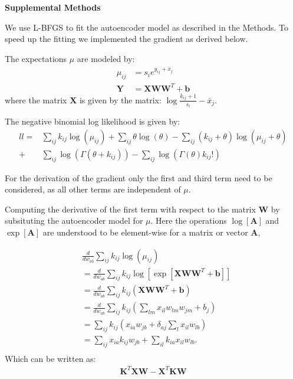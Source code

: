 \documentclass[11pt]{letter}
\newcommand{\matr}[1]{\mathbf{#1}}
\begin{document}
\textbf{Supplemental Methods}

We use L-BFGS to fit the autoencoder model as described in the Methods.
To speed up the fitting we implemented the gradient as derived below.

The expectations $\mu$ are modeled by:
\begin{align*}
\mu_{ij} &= s_{i} e^{y_{ij} + \bar{x}_j}\\
\matr{Y} &= \matr{X} \matr{W} \matr{W}^T + \matr{b}
\end{align*}
where the matrix $\matr{X}$ is given by the matrix: $\log{\frac{k_{ij}+1}{s_i}} - \bar{x}_j$. 

The negative binomial log likelihood is given by:
\begin{align*}
ll=& \sum_{ij} k_{ij} \log{(\mu_{ij})} + 
\sum_{ij} \theta \log{(\theta)} -
\sum_{ij} (k_{ij} + \theta) \log{(\mu_{ij} + \theta)} \\
+&\sum_{ij} \log{(\Gamma(\theta + k_{ij}))} 
- \sum_{ij} \log{(\Gamma({\theta}) k_{ij}!)}
\end{align*}

For the derivation of the gradient only the first and third term need to be considered, 
as all other terms are independent of $\mu$.

Computing the derivative of the first term with respect to the matrix $\matr{W}$ by subsituting the autoencoder model for $\mu$. 
Here the operations $\log[\matr{A}]$ and $\exp[\matr{A}]$ are understood to be element-wise for a matrix or vector $\matr{A}$,

\begin{align*}
&\frac{d}{dw_{ab}}\sum_{ij} k_{ij} \log{(\mu_{ij})} \\
&= \frac{d}{dw_{ab}}\sum_{ij} k_{ij} \log{[\exp{[\matr{X} \matr{W} \matr{W}^T + \matr{b}]}]} \\
&= \frac{d}{dw_{ab}}\sum_{ij} k_{ij} (\matr{X} \matr{W} \matr{W}^T + \matr{b}) \\
&= \frac{d}{dw_{ab}}\sum_{ij} k_{ij} (\sum_{lm} x_{il} w_{lm} w_{jm} + b_j) \\
&= \sum_{ij} k_{ij} (x_{ia} w_{jb} + \delta_{aj} \sum_{l} x_{il}w_{lb}) \\
&= \sum_{ij} x_{ia} k_{ij} w_{jb} + \sum_{il} k_{ia} x_{il} w_{lb}. \\
\end{align*}
Which can be written as:
\begin{align*}
\matr{K}^T \matr{X} \matr{W} - \matr{X}^T \matr{K} \matr{W}
\end{align*}
\end{document}
